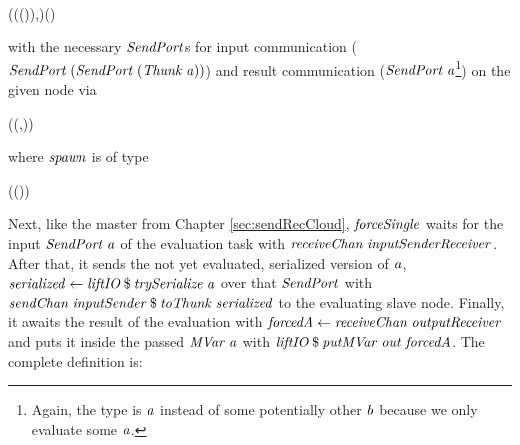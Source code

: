 \documentclass[paper=A4,twoside=true,openright,parskip=full,chapterprefix=true,headings=normal,bibliography=totoc,listof=totoc,titlepage=on,captions=tableabove,draft=false,british]{scrreprt}%
\begin{document}
\begin{hscode}\SaveRestoreHook
{}%
%
%
\>[B]{}\mathbin{::}{}\<[E]%
\\
\>[B]{}\<[5]%
\>[5]{}(\;(\;(\;)),\;)\to {}\;(){}\<[E]%
\ColumnHook
\end{hscode}\resethooks
\vspace{-2\baselineskip}

with the necessary \ensuremath{\Conid{SendPort}}s for input communication \linebreak
(\ensuremath{\Conid{SendPort}\;(\Conid{SendPort}\;(\Conid{Thunk}\;\Varid{a}))}) and result communication
(\ensuremath{\Conid{SendPort}\;\Varid{a}}\footnote{Again, the type is \ensuremath{\Varid{a}} instead of some
  potentially other \ensuremath{\Varid{b}} because we only evaluate some \ensuremath{\Varid{a}}.}) on the
given node via


\begin{hscode}\SaveRestoreHook
{}%
%
\>[B]{}\;\;(\;(,)){}\<[E]%
\ColumnHook
\end{hscode}\resethooks
\vspace{-2\baselineskip}

where \ensuremath{\Varid{spawn}} is of type


\begin{hscode}\SaveRestoreHook
{}%
%
\>[B]{}\mathbin{::}\to {}\;(\;())\to {}\;\<[E]%
\ColumnHook
\end{hscode}\resethooks
\vspace{-2\baselineskip}

Next, like the master from Chapter \ref{sec:sendRecCloud}, \ensuremath{\Varid{forceSingle}}
waits for the input \ensuremath{\Conid{SendPort}\;\Varid{a}} of the evaluation task with
\ensuremath{\Varid{receiveChan}\;\Varid{inputSenderReceiver}}. After that, it sends the not yet
evaluated, serialized version of \ensuremath{\Varid{a}},
\ensuremath{\Varid{serialized}\leftarrow \Varid{liftIO}\mathbin{\$}\Varid{trySerialize}\;\Varid{a}} over that \ensuremath{\Conid{SendPort}} with
\ensuremath{\Varid{sendChan}\;\Varid{inputSender}\mathbin{\$}\Varid{toThunk}\;\Varid{serialized}} to the evaluating slave
node. Finally, it awaits the result of the evaluation with
\ensuremath{\Varid{forcedA}\leftarrow \Varid{receiveChan}\;\Varid{outputReceiver}} and puts it inside the passed
\ensuremath{\Conid{MVar}\;\Varid{a}} with \ensuremath{\Varid{liftIO}\mathbin{\$}\Varid{putMVar}\;\Varid{out}\;\Varid{forcedA}}. The complete definition
is:
\end{document}
